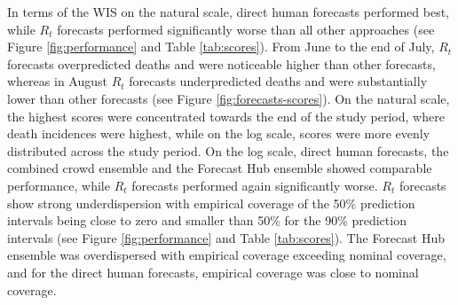\documentclass[10pt,a4paper,twocolumn]{article}
\begin{document}
In terms of the WIS on the natural scale, direct human forecasts performed best, while $R_t$ forecasts performed significantly worse than all other approaches (see Figure \ref{fig:performance} and Table \ref{tab:scores}). From June to the end of July, $R_t$ forecasts overpredicted deaths and were noticeable higher than other forecasts, whereas in August $R_t$ forecasts underpredicted deaths and were substantially lower than other forecasts (see Figure \ref{fig:forecasts-scores}). On the natural scale, the highest scores were concentrated towards the end of the study period, where death incidences were highest, while on the log scale, scores were more evenly distributed across the study period. On the log scale, direct human forecasts, the combined crowd ensemble and the Forecast Hub ensemble showed comparable performance, while $R_t$ forecasts performed again significantly worse. 
$R_t$ forecasts show strong underdispersion with empirical coverage of the 50\% prediction intervals being close to zero and smaller than 50\% for the 90\% prediction intervals (see Figure \ref{fig:performance} and Table \ref{tab:scores}). The Forecast Hub ensemble was overdispersed with empirical coverage exceeding nominal coverage, and for the direct human forecasts, empirical coverage was close to nominal coverage. 


\end{document}
